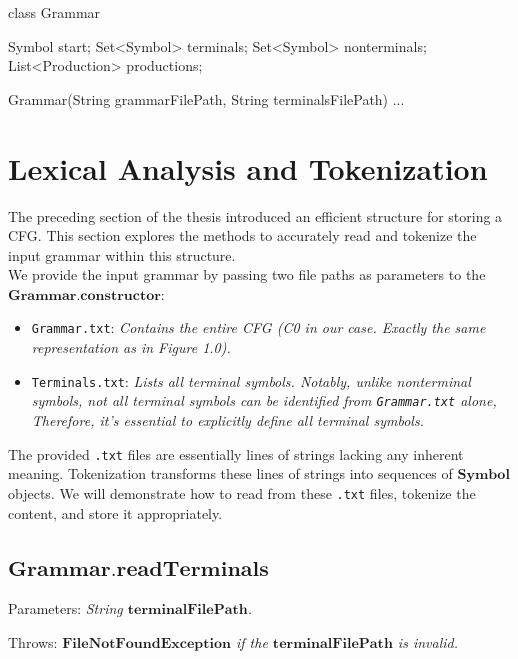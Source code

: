 \begin{codeblock}
    class Grammar {
        Symbol start;
        Set<Symbol> terminals;
        Set<Symbol> nonterminals;
        List<Production> productions;

        Grammar(String grammarFilePath, String terminalsFilePath) {}
        ...
    }
\end{codeblock}

\newpage


\section{Lexical Analysis and Tokenization}\label{sec:Lexical Analysis and Tokenization}

The preceding section of the thesis introduced an efficient structure for storing a CFG. This section explores the methods to accurately read and tokenize the input grammar within this structure.\\

We provide the input grammar by passing two file paths as parameters to the \(\boldsymbol{Grammar.constructor}\):
\begin{itemize}
    \item  \texttt{Grammar.txt}: \textit{Contains the entire CFG (C0 in our case. Exactly the same representation as in Figure 1.0).}
    \item  \texttt{Terminals.txt}: \textit{Lists all terminal symbols. Notably, unlike nonterminal symbols, not all terminal symbols can be identified from \texttt{Grammar.txt} alone, Therefore, it’s essential to explicitly define all terminal symbols.}
\end{itemize}

The provided \texttt{.txt} files are essentially lines of strings lacking any inherent meaning. Tokenization transforms these lines of strings into sequences of \(\boldsymbol{Symbol}\) objects. We will demonstrate how to read from these \texttt{.txt} files, tokenize the content, and store it appropriately.

\subsection{\(\boldsymbol{Grammar.readTerminals}\)}

Parameters: \textit{String \(\boldsymbol{terminalFilePath}\).}

Throws: \textit{\(\boldsymbol{FileNotFoundException}\) if the \(\boldsymbol{terminalFilePath}\) is invalid.}

